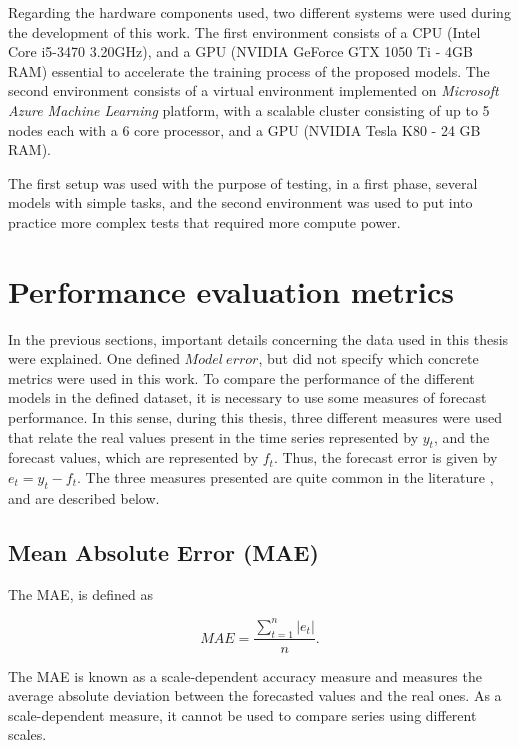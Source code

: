 Regarding the hardware components used, two different systems were used during the development of this work. The first environment consists of a CPU (Intel Core i5-3470 3.20GHz), and a GPU (NVIDIA GeForce GTX 1050 Ti - 4GB RAM) essential to accelerate the training process of the proposed models. The second environment consists of a virtual environment implemented on \textit{Microsoft Azure Machine Learning} platform, with a scalable cluster consisting of up to 5 nodes each with a 6 core processor, and a GPU (NVIDIA Tesla K80 - 24 GB RAM).

The first setup was used with the purpose of testing, in a first phase, several models with simple tasks, and the second environment was used to put into practice more complex tests that required more compute power.
	
\section{Performance evaluation metrics}\label{chap3:sec:performance_evaluation_metrics}

In the previous sections, important details concerning the data used in this thesis were explained. One defined $Model\ error$, but did not specify which concrete metrics were used in this work. To compare the performance of the different models in the defined dataset, it is necessary to use some measures of forecast performance. In this sense, during this thesis, three different measures were used that relate the real values present in the time series represented by $y_t$, and the forecast values, which are represented by $f_t$. Thus, the forecast error is given by $e_t=y_t-f_t$. The three measures presented are quite common in the literature \cite{errors}, and are described below.

\subsection{Mean Absolute Error (MAE)}

The \ac{MAE}, is defined as

\begin{equation}
     MAE =\frac {\sum_{t=1}^n|e_t|}{n}.
\label{mae}
\end{equation}

The \ac{MAE} is known as a scale-dependent accuracy measure and measures the average absolute deviation between the forecasted values and the real ones. As a scale-dependent measure, it cannot be used to compare series using different scales.


